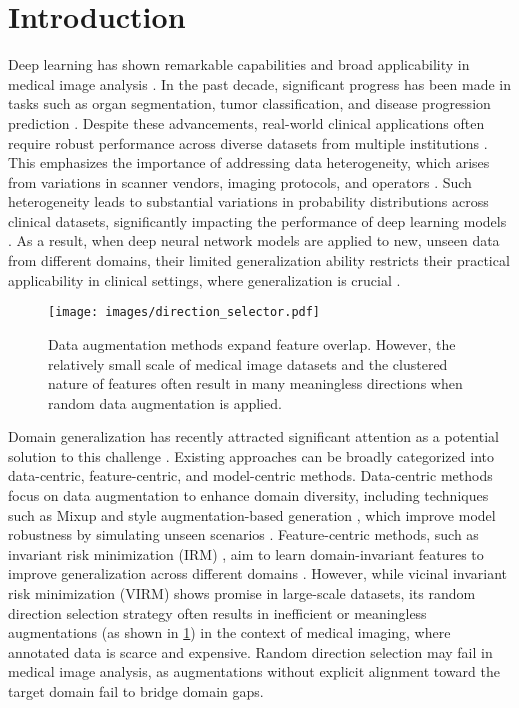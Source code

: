 \section{Introduction}
\label{sec:intro}

Deep learning has shown remarkable capabilities and broad applicability in medical image analysis \cite{10601163, 10374392}.
In the past decade, significant progress has been made in tasks such as organ segmentation, tumor classification, and disease progression prediction \cite{7404017}.
Despite these advancements, real-world clinical applications often require robust performance across diverse datasets from multiple institutions \cite{multi_center}.
This emphasizes the importance of addressing data heterogeneity, which arises from variations in scanner vendors, imaging protocols, and operators \cite{9837077}.
Such heterogeneity leads to substantial variations in probability distributions across clinical datasets, significantly impacting the performance of deep learning models \cite{liu2020ms, wang2020domainmix, li2021simple}.
As a result, when deep neural network models are applied to new, unseen data from different domains, their limited generalization ability restricts their practical applicability in clinical settings, where generalization is crucial \cite{liu2020green, dgdr2023}.

\begin{figure}
    \centering
    \texttt{[image: images/direction\_selector.pdf]}
    \caption{
        Data augmentation methods expand feature overlap. 
        However, the relatively small scale of medical image datasets and the clustered nature of features often result in many meaningless directions when random data augmentation is applied.
        }
    \label{fig:meaningless}
\end{figure}

Domain generalization has recently attracted significant attention as a potential solution to this challenge \cite{wang2022generalizing, zhou2022domain}.
Existing approaches can be broadly categorized into data-centric, feature-centric, and model-centric methods.
Data-centric methods focus on data augmentation to enhance domain diversity, including techniques such as Mixup \cite{zhang2017mixup} and style augmentation-based generation \cite{li2023intra}, which improve model robustness by simulating unseen scenarios \cite{concutmix}.
Feature-centric methods, such as invariant risk minimization (IRM) \cite{arjovsky2019invariant}, aim to learn domain-invariant features to improve generalization across different domains \cite{chen2022pair, lin2022birm, li2022invariant}.
However, while vicinal invariant risk minimization (VIRM) \cite{zhu2024enlarging} shows promise in large-scale datasets,
its random direction selection strategy often results in inefficient or meaningless augmentations (as shown in \cref{fig:meaningless}) in the context of medical imaging, where annotated data is scarce and expensive.
Random direction selection may fail in medical image analysis, as augmentations without explicit alignment toward the target domain fail to bridge domain gaps.


